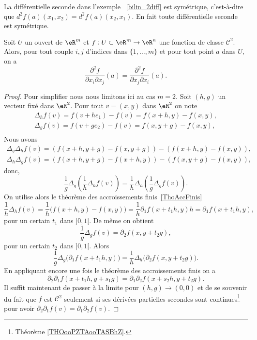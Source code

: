 La différentielle seconde dans l'exemple ~\ref{bilin_2diff} est symétrique, c'est-à-dire que $d^2f(a)(x_1,x_2)=d^2f(a)(x_2,x_1)$. En fait toute différentielle seconde est symétrique.

\begin{theorem}[Schwarz]\label{Schwarz}
 Soit $U$ un ouvert de $\eR^m$ et  $f:U\subset\eR^m\to \eR^n$ une fonction de classe $\mathcal{C}^2$. Alors, pour tout couple $i,j$ d'indices dans $\{1,\ldots, m\}$ et pour tout point $a$ dans $U$, on a
\[
\frac{\partial^2 f}{\partial  x_i\partial x_j}(a)=\frac{\partial^2 f}{\partial  x_j\partial x_i}(a).
\]
\end{theorem}
\begin{proof}
  Pour simplifier nous nous limitons ici au cas $m=2$. Soit $(h,g)$ un vecteur fixé dans $\eR^2$. Pour tout  $v=(x,y)$ dans $\eR^2$ on note
  \begin{equation}
    \begin{array}{c}
      \Delta_h f(v)=f(v+he_1) -f(v) = f(x+h,y)-f(x,y),\\
      \Delta_g f(v)=f(v+ge_2) -f(v) = f(x,y+g)-f(x,y),\\
    \end{array}
  \end{equation}
Nous avons
\begin{equation}
  \begin{array}{c}
   \Delta_g   \Delta_h f(v)=\left(f(x+h,y+g)-f(x,y+g)\right)-\left(f(x+h,y)-f(x,y)\right),\\
   \Delta_h   \Delta_g f(v)=\left(f(x+h,y+g)-f(x+h,y)\right)-\left(f(x,y+g)-f(x,y)\right),
  \end{array}
\end{equation}
donc,
\begin{equation}
  \frac{1}{g} \Delta_g  \left(\frac{1}{h} \Delta_h f(v)\right) = \frac{1}{h} \Delta_h \left(\frac{1}{g} \Delta_g f(v)\right).
\end{equation}
On utilise alors le théorème des accroissements finis~\ref{ThoAccFinis}
\begin{equation}
\frac{1}{h} \Delta_h f(v)=\frac{1}{h}\big(f(x+h,y)-f(x,y)\big)=\frac{1}{h}\partial_1f(x+t_1h,y )h=\partial_1f(x+t_1h, y),
\end{equation}
pour un certain $t_1$ dans $]0,1[$. De même on obtient
\[
\frac{1}{g} \Delta_g f(v)= \partial_2 f(x, y+t_2g),
\]
pour un certain $t_2$ dans $]0,1[$. Alors
 \begin{equation}
  \frac{1}{g} \Delta_g  \big(\partial_1f(x+t_1h, y)\big) = \frac{1}{h} \Delta_h \big(\partial_2 f(x, y+t_2g)\big).
\end{equation}
En appliquant encore une fois le théorème des accroissements finis on a
 \begin{equation}
  \partial_2\partial_1f(x+t_1h, y+s_1g) = \partial_1\partial_2 f(x+s_2h, y+t_2g).
\end{equation}
Il suffit maintenant de passer à la limite pour $(h,g) \to (0,0)$ et de se souvenir du fait que $f$ est $\mathcal{C}^2$ seulement si ses dérivées partielles secondes sont continues\footnote{Théorème \ref{THOooPZTAooTASBhZ}.} pour avoir $\partial_2\partial_1f(v)=\partial_1\partial_2 f(v)$.
\end{proof}
